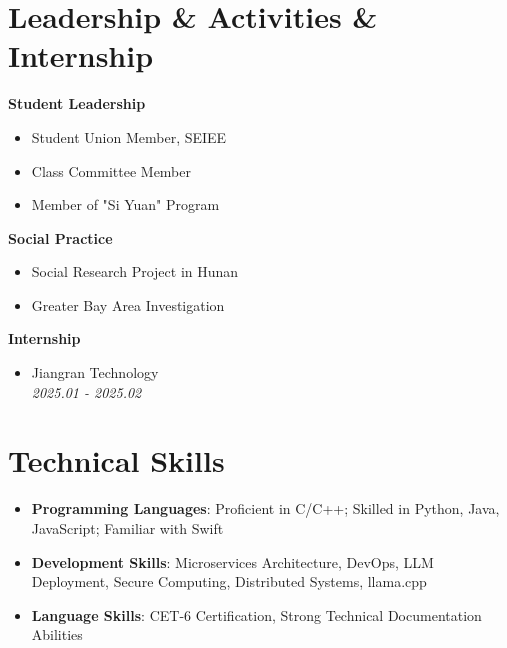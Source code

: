 \documentclass[a4paper]{article}
\begin{document}
\section*{Leadership \& Activities \& Internship}
\hspace{-0.5cm}
\begin{minipage}[t]{0.38\textwidth}
\textbf{Student Leadership}
\begin{itemize}[leftmargin=*,itemsep=0em,topsep=0em]
\item Student Union Member, SEIEE
\item Class Committee Member
\item Member of "Si Yuan" Program
\end{itemize}
\end{minipage}
\begin{minipage}[t]{0.38\textwidth}
\textbf{Social Practice}
\begin{itemize}[leftmargin=*,itemsep=0.1em,topsep=0.1em]
\item Social Research Project in Hunan
\item Greater Bay Area Investigation
\end{itemize}
\end{minipage}
\begin{minipage}[t]{0.24\textwidth}
\textbf{Internship}
\begin{itemize}[leftmargin=*,itemsep=0.1em,topsep=0.1em]
\item Jiangran Technology\\
\textit{2025.01 - 2025.02}
\end{itemize}
\end{minipage}
\section*{Technical Skills}
\begin{itemize}[leftmargin=*,itemsep=0.1em,topsep=0.1em]
\item \textbf{Programming Languages}: Proficient in C/C++; Skilled in Python, Java, JavaScript; Familiar with Swift
\item \textbf{Development Skills}: Microservices Architecture, DevOps, LLM Deployment, Secure Computing, Distributed Systems, llama.cpp
\item \textbf{Language Skills}: CET-6 Certification, Strong Technical Documentation Abilities
\end{itemize}
\end{document}
